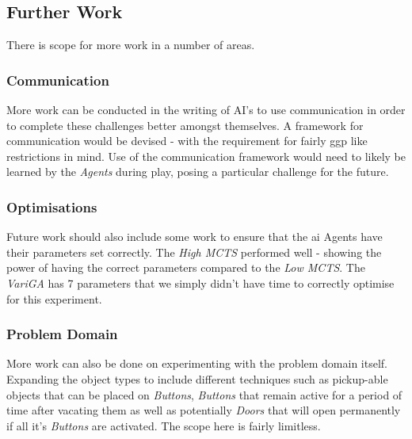 \documentclass{IEEEtran}
\begin{document}
\subsection{Further Work}
There is scope for more work in a number of areas.

\subsubsection{Communication}
More work can be conducted in the writing of AI's to use communication in order to complete these challenges better amongst themselves. A framework for communication would be devised - with the requirement for fairly \gls{ggp} like restrictions in mind. Use of the communication framework would need to likely be learned by the \emph{Agents} during play, posing a particular challenge for the future.

\subsubsection{Optimisations}
Future work should also include some work to ensure that the \gls{ai} Agents have their parameters set correctly. The \emph{High MCTS} performed well - showing the power of having the correct parameters compared to the \emph{Low MCTS}. The \emph{VariGA} has 7 parameters that we simply didn't have time to correctly optimise for this experiment.

\subsubsection{Problem Domain}
More work can also be done on experimenting with the problem domain itself. Expanding the object types to include different techniques such as pickup-able objects that can be placed on \emph{Buttons}, \emph{Buttons} that remain active for a period of time after vacating them as well as potentially \emph{Doors} that will open permanently if all it's \emph{Buttons} are activated. The scope here is fairly limitless.



\end{document}

